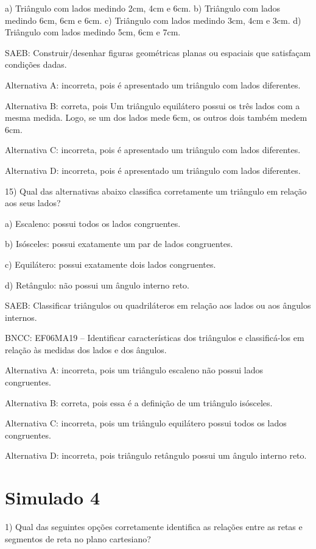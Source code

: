a) Triângulo com lados medindo 2cm, 4cm e 6cm. b) Triângulo com lados
medindo 6cm, 6cm e 6cm. c) Triângulo com lados medindo 3cm, 4cm e 3cm.
d) Triângulo com lados medindo 5cm, 6cm e 7cm.

SAEB: Construir/desenhar figuras geométricas planas ou espaciais que
satisfaçam condições dadas.

Alternativa A: incorreta, pois é apresentado um triângulo com lados
diferentes.

Alternativa B: correta, pois Um triângulo equilátero possui os três
lados com a mesma medida. Logo, se um dos lados mede 6cm, os outros dois
também medem 6cm.

Alternativa C: incorreta, pois é apresentado um triângulo com lados
diferentes.

Alternativa D: incorreta, pois é apresentado um triângulo com lados
diferentes.

15) Qual das alternativas abaixo classifica corretamente um triângulo em
relação aos seus lados?

a) Escaleno: possui todos os lados congruentes.

b) Isósceles: possui exatamente um par de lados congruentes.

c) Equilátero: possui exatamente dois lados congruentes.

d) Retângulo: não possui um ângulo interno reto.

SAEB: Classificar triângulos ou quadriláteros em relação aos lados ou
aos ângulos internos.

BNCC: EF06MA19 -- Identificar características dos triângulos e
classificá-los em relação às medidas dos lados e dos ângulos.

Alternativa A: incorreta, pois um triângulo escaleno não possui lados
congruentes.

Alternativa B: correta, pois essa é a definição de um triângulo
isósceles.

Alternativa C: incorreta, pois um triângulo equilátero possui todos os
lados congruentes.

Alternativa D: incorreta, pois triângulo retângulo possui um ângulo
interno reto.

\chapter{Simulado 4}

1) Qual das seguintes opções corretamente identifica as relações entre
as retas e segmentos de reta no plano cartesiano?

